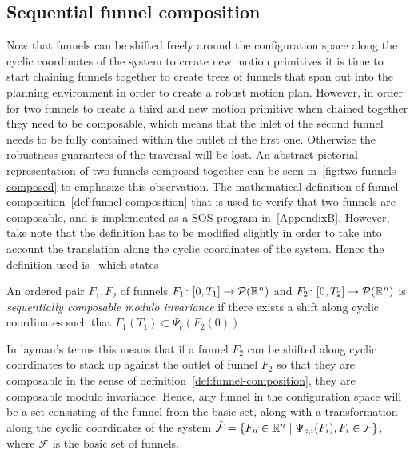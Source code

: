 \subsection{Sequential funnel composition}
\label{sec:composable-funnels}

Now that funnels can be shifted freely around the configuration space along the
cyclic coordinates of the system to create new motion primitives it is time to
start chaining funnels together to create trees of funnels that span out into
the planning environment in order to create a robust motion plan. However, in
order for two funnels to create a third and new motion primitive when chained
together they need to be composable, which means that the inlet of the second
funnel needs to be fully contained within the outlet of the first one. Otherwise
the robustness guarantees of the traversal will be lost. An abstract pictorial
representation of two funnels composed together can be seen
in~\cref{fig:two-funnels-composed} to emphasize this observation. The
mathematical definition of funnel composition~\cref{def:funnel-composition} that
is used to verify that two funnels are composable, and is implemented as a
\ac{SOS}-program in~\cref{AppendixB}. However, take note that the definition has
to be modified slightly in order to take into account the translation along the
cyclic coordinates of the system. Hence the definition used
is~\cite[definition~3,sec~5]{majumdarFunnelLibrariesRealtime2017} which states
\begin{definition}
  An ordered pair \(F_1,F_2\) of funnels \(F_1 \colon [0,T_1] \rightarrow
  \mathcal{P}(\mathbb{R}^n)\) and \(F_2 \colon [0,T_2] \rightarrow \mathcal{P}(\mathbb{R}^n)\)
  is \textit{sequentially composable modulo invariance} if there exists a shift
  along cyclic coordinates such that \(F_{1}(T_1) \subset
  \Psi_{c}\left(F_2(0)\right)\)
\end{definition}
In layman's terms this means that if a funnel \(F_2\) can be shifted along
cyclic coordinates to stack up against the outlet of funnel \(F_2\) so that they
are composable in the sense of definition~\cref{def:funnel-composition}, they
are composable modulo invariance. Hence, any funnel in the configuration space
will be a set consisting of the funnel from the basic set, along with a
transformation along the cyclic coordinates of the system \(\hat{\mathcal{F}} =
\lbrace F_n \in \mathbb{R}^n \mid \Psi_{c,i}(F_i), F_i \in \mathcal{F}\rbrace\), where
\(\mathcal{F}\) is the basic set of funnels.

